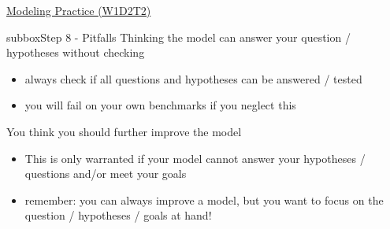 \begin{textbox}{\href{https://compneuro.neuromatch.io/tutorials/W1D2_ModelingPractice/W1D2_Intro.html}{Modeling Practice  (W1D2T2)} }
\begin{subbox}{subbox}{Step 8 - Pitfalls }
Thinking the model can answer your question / hypotheses without checking
\begin{itemize}
    \item always check if all questions and hypotheses can be answered / tested
   \item you will fail on your own benchmarks if you neglect this\end{itemize}
  

You think you should further improve the model
\begin{itemize}
    \item This is only warranted if your model cannot answer your hypotheses / questions and/or meet your goals
   \item remember: you can always improve a model, but you want to focus on the question / hypotheses / goals at hand!\end{itemize}
  
\end{subbox}
 
 
\end{textbox}
